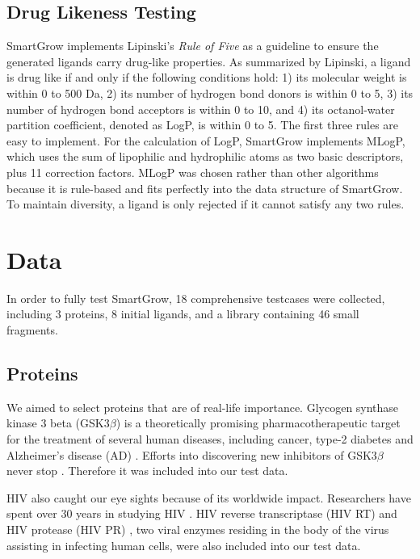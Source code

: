\subsection{Drug Likeness Testing}

SmartGrow implements Lipinski's \textit{Rule of Five} as a guideline to ensure the generated ligands carry drug-like properties. As summarized by Lipinski, a ligand is drug like if and only if the following conditions hold: 1) its molecular weight is within 0 to 500 Da, 2) its number of hydrogen bond donors is within 0 to 5, 3) its number of hydrogen bond acceptors is within 0 to 10, and 4) its octanol-water partition coefficient, denoted as LogP, is within 0 to 5. The first three rules are easy to implement. For the calculation of LogP, SmartGrow implements MLogP, which uses the sum of lipophilic and hydrophilic atoms as two basic descriptors, plus 11 correction factors. MLogP was chosen rather than other algorithms because it is rule-based and fits perfectly into the data structure of SmartGrow. To maintain diversity, a ligand is only rejected if it cannot satisfy any two rules.

\section{Data}

In order to fully test SmartGrow, 18 comprehensive testcases were collected, including 3 proteins, 8 initial ligands, and a library containing 46 small fragments.

\subsection{Proteins}

We aimed to select proteins that are of real-life importance. Glycogen synthase kinase 3 beta (GSK3$\beta$) is a theoretically promising pharmacotherapeutic target for the treatment of several human diseases, including cancer, type-2 diabetes \citep{247-2004} and Alzheimer's disease (AD) \citep{248-2006}. Efforts into discovering new inhibitors of GSK3$\beta$ never stop \citep{704-2010,728-2011,729-2011,760-2011}. Therefore it was included into our test data.

HIV also caught our eye sights because of its worldwide impact. Researchers have spent over 30 years in studying HIV \citep{300-2010,322-2010,318-2010,683-2011}. HIV reverse transcriptase (HIV RT) \citep{315-2009,312-2010,323-2010,730-2011,314-2011,320-2011,505-2011} and HIV protease (HIV PR) \citep{309-2010,673-2011,671-2011,731-2011,504-2010,556-2010}, two viral enzymes residing in the body of the virus assisting in infecting human cells, were also included into our test data.

